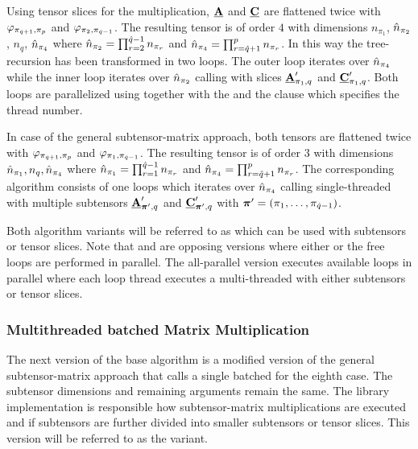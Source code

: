 Using tensor slices for the multiplication, $\underline{\mathbf{A}}$ and $\underline{\mathbf{C}}$ are flattened twice with $\varphi_{\pi_{\hat{q}+1},\pi_p}$ and $\varphi_{\pi_{2},\pi_{\hat{q}-1}}$.
The resulting tensor is of order $4$ with dimensions $n_{\pi_1}$, $\hat{n}_{\pi_2}$, $n_{q}$, $\hat{n}_{\pi_4}$ where $\hat{n}_{\pi_2} = \prod_{r=2}^{\hat{q}-1} n_{\pi_r}$ and $\hat{n}_{\pi_4} = \prod_{r=\hat{q}+1}^{p} n_{\pi_r}$.
In this way the tree-recursion has been transformed in two loops.
The outer loop iterates over $\hat{n}_{\pi_4}$ while the inner loop iterates over $\hat{n}_{\pi_2}$ calling  with slices $\underline{\mathbf{A}}_{\pi_1,q}'$ and $\underline{\mathbf{C}}_{\pi_1,q}'$.
Both loops are parallelized using  together with the  and the  clause which specifies the thread number.


In case of the general subtensor-matrix approach, both tensors are flattened twice with $\varphi_{\pi_{\hat{q}+1},\pi_p}$ and $\varphi_{\pi_{1},\pi_{\hat{q}-1}}$. 
The resulting tensor is of order $3$ with dimensions $\hat{n}_{\pi_1}, n_{q}, \hat{n}_{\pi_4}$ where $\hat{n}_{\pi_1} = \prod_{r=1}^{\hat{q}-1} n_{\pi_r}$ and $\hat{n}_{\pi_4} = \prod_{r=\hat{q}+1}^{p} n_{\pi_r}$.
The corresponding algorithm consists of one loops which iterates over $\hat{n}_{\pi_4}$ calling single-threaded  with multiple subtensors $\underline{\mathbf{A}}_{\boldsymbol{\pi}',q}'$ and $\underline{\mathbf{C}}_{\boldsymbol{\pi}',q}'$ with $\boldsymbol{\pi}' = (\pi_1,\dots,\pi_{\hat{q}-1})$.

Both algorithm variants will be referred to as  which can be used with subtensors or tensor slices.
Note that  and  are opposing versions where either  or the free loops are performed in parallel.
The all-parallel version  executes available loops in parallel where each loop thread executes a multi-threaded  with either subtensors or tensor slices.
\vspace{-1em}

\subsubsection{Multithreaded batched Matrix Multiplication}
The next version of the base algorithm is a modified version of the general subtensor-matrix approach that calls a single batched  for the eighth case.
The subtensor dimensions and remaining  arguments remain the same.
The library implementation is responsible how subtensor-matrix multiplications are executed and if subtensors are further divided into smaller subtensors or tensor slices.
This version will be referred to as the  variant.